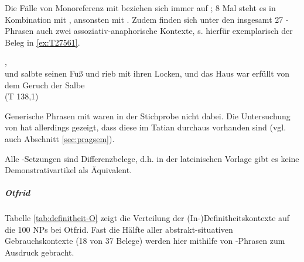 
 Die Fälle von Monoreferenz mit  beziehen sich immer auf ; 8 Mal steht es in Kombination mit , ansonsten mit . Zudem finden sich unter den insgesamt 27 -Phrasen auch zwei assoziativ-anaphorische Kontexte, s. hierfür exemplarisch der Beleg in \ref{ex:T27561}. 

%

\begin{exe}
\ex \label{ex:T27561} \gll {}        ,            \\
{und} {salbte} {seinen } {Fuß} {und} {rieb} {mit} {ihren} {Locken}, {und} {das} {Haus} {war} {erfüllt} {von} {dem} {Geruch} {der} {Salbe} \\
\glt {} (T 138,1)
\end{exe}

Generische Phrasen mit  waren in der Stichprobe nicht dabei. Die Untersuchung von \textcite{Oubouzar1989,Oubouzar1992} hat allerdings gezeigt, dass diese im Tatian durchaus vorhanden sind (vgl. auch Abschnitt \ref{sec:pragsem}).

Alle -Setzungen sind Differenzbelege, d.h. in der lateinischen Vorlage gibt es keine Demonstrativartikel als Äquivalent.

\subparagraph*{Otfrid} 

Tabelle \ref{tab:definitheit-O} zeigt die Verteilung  der (In-)Definitheitskontexte auf die 100 NPs bei Otfrid. Fast die Hälfte aller abstrakt-situativen Gebrauchskontexte (18 von 37 Belege) werden hier mithilfe von -Phrasen zum Ausdruck gebracht.

